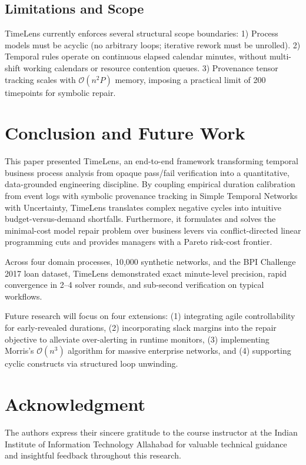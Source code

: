 \documentclass[conference]{IEEEtran}
\begin{document}
\subsection{Limitations and Scope}
TimeLens currently enforces several structural scope boundaries:
1) Process models must be acyclic (no arbitrary loops; iterative rework must be unrolled).
2) Temporal rules operate on continuous elapsed calendar minutes, without multi-shift working calendars or resource contention queues.
3) Provenance tensor tracking scales with $\mathcal{O}(n^2 P)$ memory, imposing a practical limit of 200 timepoints for symbolic repair.

\section{Conclusion and Future Work}
\label{sec:conclusion}

This paper presented TimeLens, an end-to-end framework transforming temporal business process analysis from opaque pass/fail verification into a quantitative, data-grounded engineering discipline. By coupling empirical duration calibration from event logs with symbolic provenance tracking in Simple Temporal Networks with Uncertainty, TimeLens translates complex negative cycles into intuitive budget-versus-demand shortfalls. Furthermore, it formulates and solves the minimal-cost model repair problem over business levers via conflict-directed linear programming cuts and provides managers with a Pareto risk-cost frontier.

Across four domain processes, 10,000 synthetic networks, and the BPI Challenge 2017 loan dataset, TimeLens demonstrated exact minute-level precision, rapid convergence in 2--4 solver rounds, and sub-second verification on typical workflows.

Future research will focus on four extensions: (1) integrating agile controllability \cite{posenato2024} for early-revealed durations, (2) incorporating slack margins into the repair objective to alleviate over-alerting in runtime monitors, (3) implementing Morris's $\mathcal{O}(n^3)$ algorithm \cite{morris2014} for massive enterprise networks, and (4) supporting cyclic constructs via structured loop unwinding.

\section*{Acknowledgment}
The authors express their sincere gratitude to the course instructor at the Indian Institute of Information Technology Allahabad for valuable technical guidance and insightful feedback throughout this research.
\end{document}
